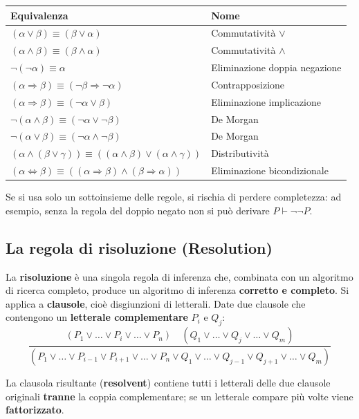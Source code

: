 \documentclass[11pt,a4paper]{report}
\begin{document}
\begin{center}
\small
\begin{tabular}{@{}p{6.5cm}p{4.5cm}@{}}
\toprule
\textbf{Equivalenza} & \textbf{Nome} \\
\midrule
$(\alpha\vee\beta)\equiv(\beta\vee\alpha)$ & Commutatività $\vee$ \\
$(\alpha\wedge\beta)\equiv(\beta\wedge\alpha)$ & Commutatività $\wedge$ \\
$\neg(\neg\alpha)\equiv\alpha$ & Eliminazione doppia negazione \\
$(\alpha\Rightarrow\beta)\equiv(\neg\beta\Rightarrow\neg\alpha)$ & Contrapposizione \\
$(\alpha\Rightarrow\beta)\equiv(\neg\alpha\vee\beta)$ & Eliminazione implicazione \\
$\neg(\alpha\wedge\beta)\equiv(\neg\alpha\vee\neg\beta)$ & De Morgan \\
$\neg(\alpha\vee\beta)\equiv(\neg\alpha\wedge\neg\beta)$ & De Morgan \\
$(\alpha\wedge(\beta\vee\gamma))\equiv((\alpha\wedge\beta)\vee(\alpha\wedge\gamma))$ & Distributività \\
$(\alpha\Leftrightarrow\beta)\equiv((\alpha\Rightarrow\beta)\wedge(\beta\Rightarrow\alpha))$ & Eliminazione bicondizionale \\
\bottomrule
\end{tabular}
\normalsize
\end{center}

Se si usa solo un sottoinsieme delle regole, si rischia di perdere completezza: ad esempio, senza la regola del doppio negato non si può derivare $P \vdash \neg\neg P$.

\subsection*{La regola di risoluzione (Resolution)}

La \textbf{risoluzione} è una singola regola di inferenza che, combinata con un algoritmo di ricerca completo, produce un algoritmo di inferenza \textbf{corretto e completo}. Si applica a \textbf{clausole}, cioè disgiunzioni di letterali. Date due clausole che contengono un \textbf{letterale complementare} $P_i$ e $Q_j$:
\[
\frac{(P_1\vee\dots\vee P_i\vee\dots\vee P_n) \quad (Q_1\vee\dots\vee Q_j\vee\dots\vee Q_m)}{(P_1\vee\dots\vee P_{i-1}\vee P_{i+1}\vee\dots\vee P_n \vee Q_1\vee\dots\vee Q_{j-1}\vee Q_{j+1}\vee\dots\vee Q_m)}
\]

La clausola risultante (\textbf{resolvent}) contiene tutti i letterali delle due clausole originali \textbf{tranne} la coppia complementare; se un letterale compare più volte viene \textbf{fattorizzato}.
\end{document}
